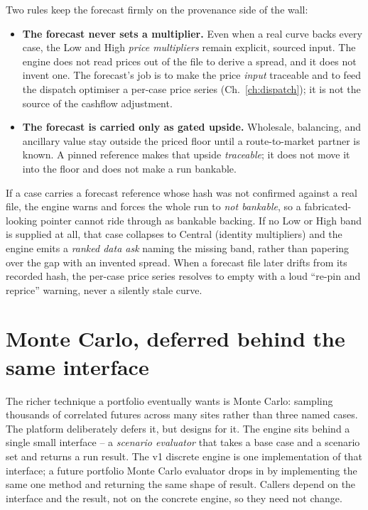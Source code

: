 Two rules keep the forecast firmly on the provenance side of the wall:

\begin{itemize}
  \item \textbf{The forecast never sets a multiplier.} Even when a real curve backs every case, the Low and High \emph{price multipliers} remain explicit, sourced input. The engine does not read prices out of the file to derive a spread, and it does not invent one. The forecast's job is to make the price \emph{input} traceable and to feed the dispatch optimiser a per-case price series (Ch.~\ref{ch:dispatch}); it is not the source of the cashflow adjustment.
  \item \textbf{The forecast is carried only as gated upside.} Wholesale, balancing, and ancillary value stay outside the priced floor until a route-to-market partner is known. A pinned reference makes that upside \emph{traceable}; it does not move it into the floor and does not make a run bankable.
\end{itemize}

\begin{caution}
If a case carries a forecast reference whose hash was not confirmed against a real file, the engine warns and forces the whole run to \emph{not bankable}, so a fabricated-looking pointer cannot ride through as bankable backing. If no Low or High band is supplied at all, that case collapses to Central (identity multipliers) and the engine emits a \emph{ranked data ask} naming the missing band, rather than papering over the gap with an invented spread. When a forecast file later drifts from its recorded hash, the per-case price series resolves to empty with a loud ``re-pin and reprice'' warning, never a silently stale curve.
\end{caution}

\section{Monte Carlo, deferred behind the same interface}

The richer technique a portfolio eventually wants is Monte Carlo: sampling thousands of correlated futures across many sites rather than three named cases. The platform deliberately defers it, but designs for it. The engine sits behind a single small interface -- a \emph{scenario evaluator} that takes a base case and a scenario set and returns a run result. The v1 discrete engine is one implementation of that interface; a future portfolio Monte Carlo evaluator drops in by implementing the same one method and returning the same shape of result. Callers depend on the interface and the result, not on the concrete engine, so they need not change.

